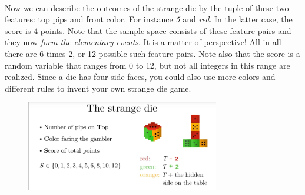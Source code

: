 \documentclass[12pt, a4paper]{scrartcl}
\begin{document}
\\

Now we can describe the outcomes of the strange die by the tuple of these two features: top pips and front color. For instance \textit{5} and \textit{red}. In the latter case, the score is 4 points.
Note that the sample space consists of these feature pairs and they now \textit{form the elementary events}. It is a matter of perspective!
All in all there are 6 times 2, or 12 possible such feature pairs.
Note also that the score is a random variable that ranges from 0 to 12, but not all integers in this range are realized. 
Since a die has four side faces, you could also use more colors and different rules to invent your own strange die game.\\
\begin{figure}[H]
	\centering
	\includegraphics[width=0.75\textwidth]{3_2.png}
\end{figure}
\\
\end{document}
